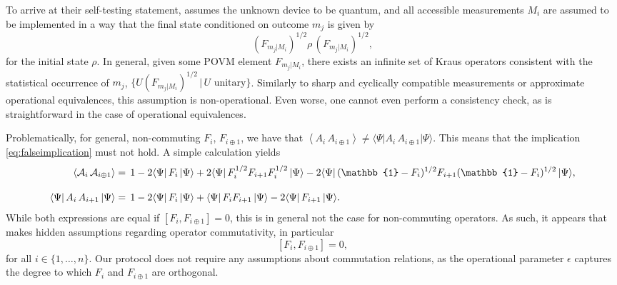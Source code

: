 To arrive at their self-testing statement, \cite{Saha2020} assumes the unknown device to be quantum, and all accessible measurements $M_i$ are assumed to be implemented in a way that the final state conditioned on outcome $m_j$ is given by
\[(F_{m_j\vert M_i})^{1/2}\rho \,(F_{m_j\vert M_i})^{1/2},\]
for the initial state $\rho$.
In general, given some POVM element $F_{m_j\vert M_i}$, there exists an infinite set of Kraus operators consistent with the statistical occurrence of $m_j$, $\{U(F_{m_j\vert M_i})^{1/2}\,\vert\, U \text{ unitary}\}$. Similarly to sharp and cyclically compatible measurements or approximate operational equivalences, this assumption is non-operational. Even worse, one cannot even perform a consistency check, as is straightforward in the case of operational equivalences.

Problematically, for general, non-commuting $F_i$, $F_{i\oplus 1}$, we have that $\left<A_i \,A_{i\oplus 1}\right>\neq \langle \Psi \vert A_i\, A_{i\oplus 1}\vert \Psi \rangle$. This means that the implication \ref{eq:falseimplication} must not hold. A simple calculation yields
\[
\begin{split}
\langle \mathcal{A}_i \,\mathcal{A}_{i\oplus1}\rangle & =  \thinspace  1 - 2\langle \Psi \vert\, F_i\, \vert \Psi \rangle + 2 \langle \Psi \vert \,F_i^{1/2} F_{i+1} F_i^{1/2}\, \vert  \Psi \rangle - 2 \langle \Psi \vert \, (\mathbb{1}-F_i)^{1/2} F_{i+1} (\mathbb{1}-F_i)^{1/2} \, \vert \Psi \rangle,\\[1em]
\langle \Psi \vert\, A_i\, A_{i+1}\, \vert \Psi \rangle & =  \thinspace 1-2\langle \Psi \vert\, F_i \,\vert \Psi \rangle + \langle \Psi \vert \, F_i F_{i+1} \,\vert \Psi \rangle - 2 \langle \Psi \vert\, F_{i+1}\, \vert \Psi \rangle.
\end{split}
\]
While both expressions are equal if $\left[F_i, F_{i\oplus 1}\right]=0$, this is in general not the case for non-commuting operators. As such, it appears that \cite{Saha2020} makes hidden assumptions regarding operator commutativity, in particular \[\left[F_i,F_{i\oplus 1}\right]=0,\] for all $i\in\{1,\dots,n\}$. Our protocol does not require any assumptions about commutation relations, as the operational parameter $\epsilon$ captures the degree to which $F_i$ and $F_{i\oplus 1}$ are orthogonal.